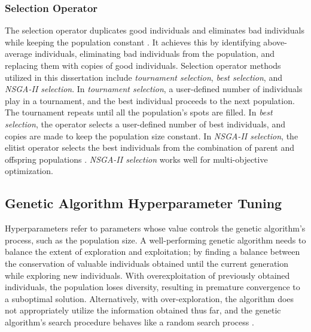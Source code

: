 \subsubsection{Selection Operator}
The selection operator duplicates good individuals and eliminates bad individuals 
while keeping the population constant \cite{deb_multi-objective_2001}. 
It achieves this by identifying above-average individuals, eliminating bad 
individuals from the population, and replacing them with copies of good individuals.
Selection operator methods utilized in this dissertation include \textit{tournament 
selection}, \textit{best selection}, and \textit{\gls{NSGA-II} selection}. 
In \textit{tournament selection}, a user-defined number of individuals play in a
tournament, and the best individual proceeds to the next population. 
The tournament repeats until all the population's spots are filled.
In \textit{best selection}, the operator selects a user-defined number of best 
individuals, and copies are made to keep the population size constant. 
In \textit{NSGA-II selection}, the elitist operator selects the best individuals 
from the combination of parent and offspring populations \cite{deb_fast_2002}.
\textit{NSGA-II selection} works well for multi-objective optimization. 

\subsection{Genetic Algorithm Hyperparameter Tuning}
\label{sec:balance}
Hyperparameters refer to parameters whose value controls 
the genetic algorithm's process, such as the population size. 
A well-performing genetic algorithm needs to balance the extent of exploration and 
exploitation; by finding a balance between the conservation of 
valuable individuals obtained until the current generation while exploring new 
individuals. 
With overexploitation of previously obtained individuals, the population loses 
diversity, resulting in premature convergence to a suboptimal solution. 
Alternatively, with over-exploration, the algorithm does not appropriately utilize 
the information obtained thus far, and the genetic algorithm's search procedure 
behaves like a random search process
\cite{deb_multi-objective_2001}. 

